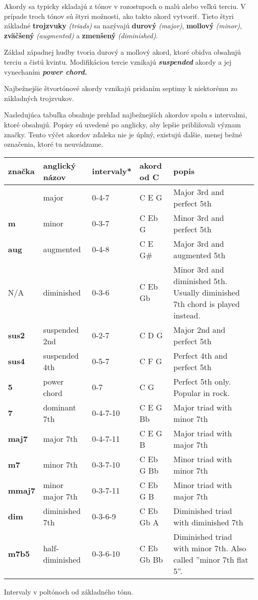 \begin{center}
\normalsize
{} \quad {}
\end{center}

Akordy sa typicky skladajú z tónov v rozostupoch o malú alebo veľkú terciu. V prípade troch tónov sú štyri možnosti,
ako takto akord vytvoriť. Tieto štyri základné \textbf{trojzvuky} \textit{(triads)} sa nazývajú
\textbf{durový} \textit{(major)}, \textbf{mollový} \textit{(minor)}, \textbf{zväčšený} \textit{(augmented)}
a \textbf{zmenšený} \textit{(diminished)}.

Základ západnej hudby tvoria durový a mollový akord, ktoré obidva obsahujú terciu a čistú kvintu. Modifikáciou
tercie vznikajú \textbf{\textit{suspended}} akordy a jej vynechaním \textbf{\textit{power chord.}}

Najbežnejšie štvortónové akordy vznikajú pridaním septimy k niektorému zo základných trojzvukov.

Nasledujúca tabuľka obsahuje prehľad najbežnejších akordov spolu s intervalmi, ktoré obsahujú.
Popisy sú uvedené po anglicky, aby lepšie približovali význam značky. Tento výčet akordov zďaleka
nie je úplný, existujú ďalšie, menej bežné označenia, ktoré tu neuvádzame.

{\smaller
\begin{tabularx}{\linewidth}{ l l l l X }
    značka & anglický názov & intervaly* & akord od C & popis \\
    \hline
      & major & 0-4-7 & C E G & Major 3rd and perfect 5th \\
    \textbf{m} & minor & 0-3-7 & C Eb G & Minor 3rd and perfect 5th \\
    \textbf{aug} & augmented & 0-4-8 & C E G\# & Major 3rd and augmented 5th \\
    N/A & diminished & 0-3-6 & C Eb Gb & Minor 3rd and diminished 5th. Usually diminished 7th chord is played instead. \\
    \hline
    \textbf{sus2} & suspended 2nd & 0-2-7 & C D G & Major 2nd and perfect 5th  \\
    \textbf{sus4} & suspended 4th & 0-5-7 & C F G & Perfect 4th and perfect 5th \\
    \textbf{5} & power chord & 0-7 & C G & Perfect 5th only. Popular in rock. \\
    \hline
    \textbf{7} & dominant 7th &  0-4-7-10 & C E G Bb & Major triad with minor 7th  \\
    \textbf{maj7} & major 7th &  0-4-7-11 & C E G B & Major triad with major 7th \\
    \textbf{m7} & minor 7th &  0-3-7-10 & C Eb G Bb & Minor triad with minor 7th \\
    \textbf{mmaj7} & minor major 7th &  0-3-7-11 & C Eb G B & Minor triad with major 7th \\
    \textbf{dim} & diminished 7th &  0-3-6-9 & C Eb Gb A & Diminished triad with diminished 7th \\
    \textbf{m7b5} & half-diminished &  0-3-6-10 & C Eb Gb Bb & Diminished triad with minor 7th. Also called ''minor 7th flat 5''. \\
\end{tabularx}
}
{\smaller *Intervaly v poltónoch od základného tónu.}

